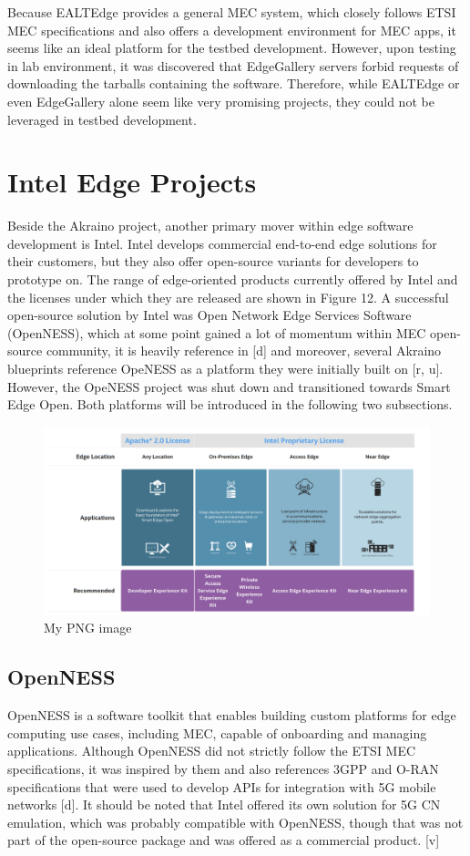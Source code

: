 \documentclass[12pt,a4paper,twoside]{report}
\begin{document}
Because EALTEdge provides a general MEC system, which closely follows ETSI MEC specifications and also offers a development environment for MEC apps, it seems like an ideal platform for the testbed development. However, upon testing in lab environment, it was discovered that EdgeGallery servers forbid requests of downloading the tarballs containing the software. Therefore, while EALTEdge or even EdgeGallery alone seem like very promising projects, they could not be leveraged in testbed development.

\section{Intel Edge Projects}
Beside the Akraino project, another primary mover within edge software development is Intel. Intel develops commercial end-to-end edge solutions for their customers, but they also offer open-source variants for developers to prototype on. The range of edge-oriented products currently offered by Intel and the licenses under which they are released are shown in Figure 12. A successful open-source solution by Intel was Open Network Edge Services Software (OpenNESS), which at some point gained a lot of momentum within MEC open-source community, it is heavily reference in [d] and moreover, several Akraino blueprints reference OpeNESS as a platform they were initially built on [r, u]. However, the OpeNESS project was shut down and transitioned towards Smart Edge Open. Both platforms will be introduced in the following two subsections.
\begin{figure}[ht]
	\centering
	\includegraphics[width=13cm]{./images/intel-solu.png} 
	\caption{My PNG image}
\end{figure}

\subsection{OpenNESS}
OpenNESS is a software toolkit that enables building custom platforms for edge computing use cases, including MEC, capable of onboarding and managing applications. Although OpenNESS did not strictly follow the ETSI MEC specifications, it was inspired by them and also references 3GPP and O-RAN specifications that were used to develop APIs for integration with 5G mobile networks [d]. It should be noted that Intel offered its own solution for 5G CN emulation, which was probably compatible with OpenNESS, though that was not part of the open-source package and was offered as a commercial product. [v] 
\end{document}
